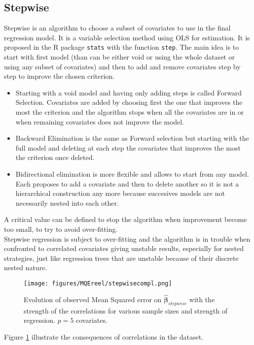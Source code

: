 \documentclass[12pt,a4paper]{report}
\begin{document}
			\subsection{Stepwise}
			
			Stepwise \cite{seber2012linear} is an algorithm to choose a subset of covariates to use in the final regression model. It is a variable selection method using OLS for estimation. It is proposed in the R package {\tt stats} with the function {\tt step}. The main idea is to start with first model (than can be either void or using the whole dataset or using any subset of covariates) and then to add and remove covariates step by step to improve the chosen criterion. \\
			\begin{itemize}
				\item 	Starting with a void model and having only adding steps is called Forward Selection. Covariates are added by choosing first the one that improves the most the criterion and the algorithm stops when all the covariates are in or when remaining covariates does not improve the model.
				\item Backward Elimination is the same as Forward selection but starting with the full model and deleting at each step the covariates that improves the most the criterion once deleted.
				\item Bidirectional elimination is more flexible and allows to start from any model. Each proposes to add a covariate and then to delete another so it is not a hierarchical construction any more because succesives models are not necessarily nested into each other.
			\end{itemize}
		A critical value can be defined to stop the algorithm when improvement become too small, to try to avoid over-fitting. \\
		Stepwise regression is subject to over-fitting and the algorithm is in trouble when confronted to correlated covariates \cite{miller2002subset} giving unstable results, especially for nested strategies, just like regression trees that are unstable because of their discrete nested nature.
\begin{figure}
	 \centering
	  \texttt{[image: figures/MQEreel/stepwisecompl.png]}
	  \caption{Evolution of observed Mean Squared error on $\hat{\boldsymbol{\beta}}_{stepwise}$ with the strength of the correlations for various sample sizes and strength of regression. $p=5$ covariates. } \label{MQEstepwisecompl}
	\end{figure}
	Figure \ref{MQEstepwisecompl} illustrate the consequences of correlations in the dataset.
	
\end{document}
